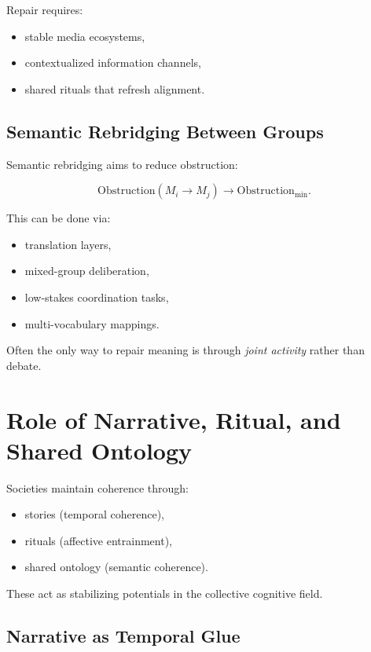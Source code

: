 \documentclass[12pt,oneside]{book}
\theoremstyle{plain}
\theoremstyle{definition}
\begin{document}
Repair requires:

\begin{itemize}
    \item stable media ecosystems,
    \item contextualized information channels,
    \item shared rituals that refresh alignment.
\end{itemize}

\subsection{Semantic Rebridging Between Groups}

Semantic rebridging aims to reduce obstruction:

\[
\mathrm{Obstruction}(M_i \to M_j)
\to
\mathrm{Obstruction}_{\min}.
\]

This can be done via:

\begin{itemize}
    \item translation layers,
    \item mixed-group deliberation,
    \item low-stakes coordination tasks,
    \item multi-vocabulary mappings.
\end{itemize}

Often the only way to repair meaning is through \emph{joint activity} rather than 
debate.

\section{Role of Narrative, Ritual, and Shared Ontology}

Societies maintain coherence through:

\begin{itemize}
    \item stories (temporal coherence),
    \item rituals (affective entrainment),
    \item shared ontology (semantic coherence).
\end{itemize}

These act as stabilizing potentials in the collective cognitive field.

\subsection{Narrative as Temporal Glue}
\end{document}
